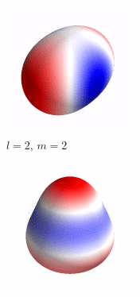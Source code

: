 \begin{figure}[ht]
    \begin{subfigure}[b]{0.2\linewidth}
        \includegraphics[width=\linewidth]{introduction/images/2_2.png}
        \caption*{$l=2,\,m=2$}
    \end{subfigure}%
    \begin{subfigure}[b]{0.2\linewidth}
        \includegraphics[width=\linewidth]{introduction/images/3_0.png}

\end{subfigure}
\end{figure}
